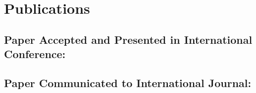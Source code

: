 \chapter*{Publications}
\section*{Paper Accepted and Presented in International Conference:}

\section*{Paper Communicated to International Journal:}
